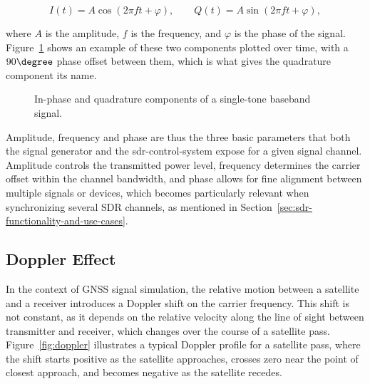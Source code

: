 \begin{equation}
  I(t) = A\cos\left(2\pi f t + \varphi\right), \qquad
  Q(t) = A\sin\left(2\pi f t + \varphi\right),
  \label{eq:iq-components}
\end{equation}

\noindent where $A$ is the amplitude, $f$ is the frequency, and $\varphi$ is
the phase of the signal. Figure~\ref{fig:iq-components} shows an example of
these two components plotted over time, with a $90\degree$ phase offset
between them, which is what gives the quadrature component its name.\cite{pysdrSamplingPySDR}

\begin{figure}[htbp]
  \centering
  \caption{In-phase and quadrature components of a single-tone baseband signal.}
  \label{fig:iq-components}
\end{figure}

Amplitude, frequency and phase are thus the three basic parameters that both
the signal generator and the \gls{sdr-control-system} expose for a given signal
channel. Amplitude controls the transmitted power level, frequency determines
the carrier offset within the channel bandwidth, and phase allows for fine
alignment between multiple signals or devices, which becomes particularly
relevant when synchronizing several \gls{SDR} channels, as mentioned in
Section~\ref{sec:sdr-functionality-and-use-cases}.

\subsection{Doppler Effect}

In the context of \gls{GNSS} signal simulation, the relative motion between a
satellite and a receiver introduces a Doppler shift on the carrier frequency.
This shift is not constant, as it depends on the relative velocity along the
line of sight between transmitter and receiver, which changes over the course
of a satellite pass. Figure~\ref{fig:doppler} illustrates a typical Doppler
profile for a satellite pass, where the shift starts positive as the satellite
approaches, crosses zero near the point of closest approach, and becomes
negative as the satellite recedes.

